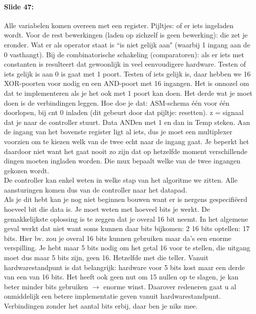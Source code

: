 \documentclass[10pt,a4paper]{book}
\begin{document}
\paragraph{Slide 47:} Alle variabelen komen overeen met een register. Pijltjes: of er iets ingeladen wordt. Voor de rest bewerkingen (laden op zichzelf is geen bewerking): die zet je eronder. Wat er als operator staat is ``is niet gelijk aan" (waarbij 1 ingang aan de 0 vasthangt). Bij de combinatorische schakeling (comparatoren): als er iets met constanten is resulteert dat gewoonlijk in veel eenvoudigere hardware. Testen of iets gelijk is aan 0 is gaat met 1 poort. Testen of iets gelijk is, daar hebben we 16 XOR-poorten voor nodig en een AND-poort met 16 ingangen. Het is onnozel om dat te implementeren als je het ook met 1 poort kan doen. Het derde wat je moet doen is de verbindingen leggen. Hoe doe je dat: ASM-schema \'e\'en voor \'e\'en doorlopen, bij cnt 0 inladen (dit gebeurt door dat pijltje: resetten). z = signaal dat je naar de controller stuurt. Data ANDen met 1 en dan in Temp steken. Aan de ingang van het bovenste register ligt al iets, dus je moet een multiplexer voorzien om te kiezen welk van de twee echt naar de ingang gaat. Je beperkt het daardoor niet want het gaat nooit zo zijn dat op hetzelfde moment verschillende dingen moeten ingladen worden. Die mux bepaalt welke van de twee ingangen gekozen wordt.\\
De controller kan enkel weten in welke stap van het algoritme we zitten. Alle aansturingen komen dus van de controller naar het datapad.\\
Als je dit hebt kan je nog niet beginnen bouwen want er is nergens gespecifi\"eerd hoeveel bit die data is. Je moet weten met hoeveel bits je werkt. De gemakkelijkste oplossing is te zeggen dat je overal 16 bit neemt. In het algemene geval werkt dat niet want soms kunnen daar bits bijkomen: 2 16 bits optellen: 17 bits. Hier bv. zou je overal 16 bits kunnen gebruiken maar da's een enorme verspilling. Je hebt maar 5 bits nodig om het getal 16 voor te stellen, die uitgang moet dus maar 5 bits zijn, geen 16. Hetzelfde met die teller. Vanuit hardwarestandpunt is dat belangrijk: hardware voor 5 bits kost maar een derde van een van 16 bits. Het heeft ook geen nut om 15 nullen op te slagen, je kan beter minder bits gebruiken $\rightarrow$ enorme winst. Daarover redeneren gaat u al onmiddelijk een betere implementatie geven vanuit hardwarestandpunt.\\
Verbindingen zonder het aantal bits erbij, daar ben je niks mee.
\end{document}
